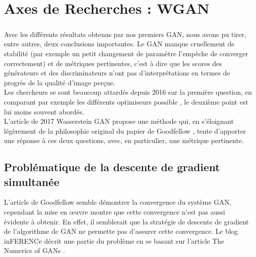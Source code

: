 

\chapter{Axes de Recherches : WGAN}

\paragraph*{} Avec les différents résultats obtenus par nos premiers GAN, nous avons pu tirer, entre autres, deux conclusions importantes. Le GAN manque cruellement de stabilité (par exemple un petit changement de paramètre l'empêche de converger correctement) et de métriques pertinentes, c'est à dire que les scores des générateurs et des discriminateurs n'ont pas d'interprétations en termes de progrès de la qualité d'image perçue.\\
Les chercheurs se sont beaucoup attardés depuis 2016 sur la première question, en comparant par exemple les différents optimiseurs possible \cite{optimiser}, le deuxième point est lui moins souvent abordés. \\
L'article de 2017 Wasserstein GAN \cite{wgan} propose une méthode qui, en s'éloignant légèrement de la philosophie original du papier de Goodfellow \cite{Goodfellow-et-al-2016}, tente d'apporter une réponse à ces deux questions, avec, en particulier, une métrique pertinente.

\section{Problématique de la descente de gradient simultanée}

L'article de Goodfellow semble démontrer la convergence du système GAN, cependant la mise en œuvre montre que cette convergence n'est pas aussi évidente à obtenir. En effet, il semblerait que la stratégie de descente de gradient de l'algorithme de GAN ne permette pas d'assurer cette convergence. Le blog inFERENCe \cite{conservative-field} décrit une partie du problème en se basant sur l'article The Numerics of GANs \cite{numerics-gan}.


